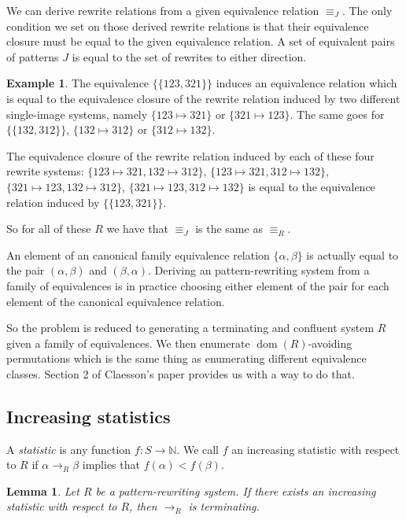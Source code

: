 \documentclass[openany, a4paper, 11pt, english]{article}
\newcommand{\patternrule}{ \mapsto \!}
\newtheorem{lemma}[theorem]{Lemma}
\theoremstyle{definition}
\newtheorem{example}[theorem]{Example}
\newcommand{\Sym}{S}
\DeclareMathOperator{\dom}{dom}
\begin{document}
We can derive rewrite relations from a given equivalence relation $\equiv_J$.
The only condition we set on those derived rewrite relations is that their
equivalence closure must be equal to the given equivalence relation.
A set of equivalent pairs of patterns $J$ is equal to the set of rewrites to
either direction. 
\begin{example}
    The equivalence $\{ \{123, 321 \} \}$ induces an equivalence relation which is
    equal to the equivalence closure of the rewrite relation induced by two
    different single-image systems, namely $\{123 \patternrule 321\}$ or $\{321
    \patternrule 123\}$. The same goes for $\{ \{ 132, 312 \} \}$, $\{132 \patternrule
    312\}$ or $\{312 \patternrule 132\}$.

    The equivalence closure of the rewrite relation induced by each of these
    four rewrite systems: $\{123 \patternrule 321, 132 \patternrule 312\}$, $\{123
    \patternrule 321, 312 \patternrule 132\}$, $\{321 \patternrule 123, 132
    \patternrule 312\}$, $\{321 \patternrule 123, 312 \patternrule 132\}$ is
    equal to the equivalence relation induced by $\{ \{ 123, 321 \} \}$.

    So for all of these $R$ we have that $\equiv_J$ is the same as $\equiv_R$.
\end{example}

An element of an canonical family equivalence relation $\{ \alpha, \beta \}$ is
actually equal to the pair $(\alpha, \beta)$ and $(\beta, \alpha)$.
Deriving an pattern-rewriting system from a family of equivalences is in
practice choosing either element of the pair for each element of the canonical
equivalence relation.

So the problem is reduced to generating a terminating and confluent system $R$
given a family of equivalences. We then enumerate $\dom(R)$-avoiding
permutations which is the same thing as enumerating different equivalence
classes.  Section 2 of Claesson's paper provides us with a way to do that.
\cite{claesson:2021}

\subsection{Increasing statistics}
A \emph{statistic} is any function $f : \Sym \to \mathbb{N}$. We call $f$ an increasing
statistic with respect to $R$ if $\alpha \to_R \beta$ implies that $f(\alpha) < f(\beta)$.

\begin{lemma}
    Let $R$ be a pattern-rewriting system. If there exists an increasing
    statistic with respect to $R$, then $\to_R$ is terminating.    
\end{lemma}
\end{document}
